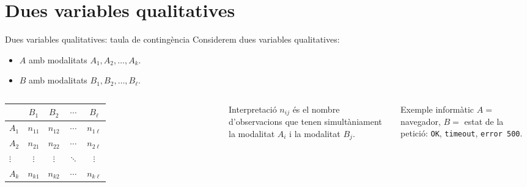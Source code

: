 \documentclass[10pt,aspectratio=169]{beamer}
\begin{document}
\section{Dues variables qualitatives}

\begin{frame}{Dues variables qualitatives: taula de contingència}
Considerem dues variables qualitatives:
\begin{itemize}
  \item $A$ amb modalitats $A_1,A_2,\ldots,A_k$.
  \item $B$ amb modalitats $B_1,B_2,\ldots,B_\ell$.
\end{itemize}
\vspace{0.2cm}
\begin{columns}[T]
\centering
\small
\begin{tabular}{lcccc}
\toprule
 & $B_1$ & $B_2$ & $\cdots$ & $B_\ell$ \\
\midrule
$A_1$ & $n_{11}$ & $n_{12}$ & $\cdots$ & $n_{1\ell}$ \\
$A_2$ & $n_{21}$ & $n_{22}$ & $\cdots$ & $n_{2\ell}$ \\
$\vdots$ & $\vdots$ & $\vdots$ & $\ddots$ & $\vdots$ \\
$A_k$ & $n_{k1}$ & $n_{k2}$ & $\cdots$ & $n_{k\ell}$ \\
\bottomrule
\end{tabular}
\begin{block}{Interpretació}
$n_{ij}$ és el nombre d'observacions que tenen simultàniament la modalitat $A_i$ i la modalitat $B_j$.
\end{block}
\begin{exampleblock}{Exemple informàtic}
$A =$ navegador, $B =$ estat de la petició: \texttt{OK}, \texttt{timeout}, \texttt{error 500}.
\end{exampleblock}
\end{columns}
\end{frame}
\end{document}
